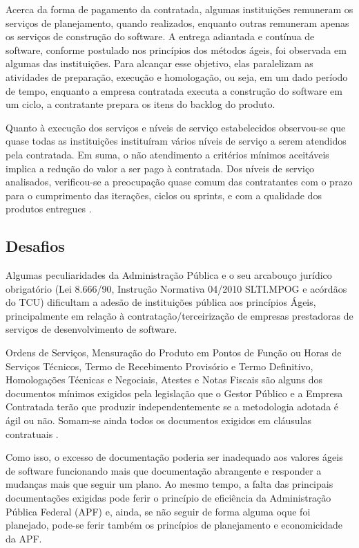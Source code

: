 Acerca da forma de pagamento da contratada, algumas instituições remuneram os serviços de planejamento, quando realizados, enquanto outras remuneram apenas os serviços de construção do software. A entrega adiantada e contínua de software, conforme postulado nos princípios dos métodos ágeis, foi observada em algumas das instituições. Para alcançar esse objetivo, elas paralelizam as atividades de preparação, execução e homologação, ou seja, em um dado período de tempo, enquanto a empresa contratada executa a construção do software em um ciclo, a contratante prepara os itens do backlog do produto. 

Quanto à execução dos serviços e níveis de serviço estabelecidos observou-se que quase todas as instituições instituíram vários níveis de serviço a serem atendidos pela contratada. Em suma, o não atendimento a critérios mínimos aceitáveis implica a redução do valor a ser pago à contratada. Dos níveis de serviço analisados, verificou-se a preocupação quase comum das contratantes com o prazo para o cumprimento das iterações, ciclos ou sprints, e com a qualidade dos produtos entregues  \cite{TCU:2013}.

\subsection[Desafios]{Desafios}

Algumas peculiaridades da Administração Pública e o seu arcabouço jurídico obrigatório (Lei 8.666/90, Instrução Normativa 04/2010 SLTI.MPOG e acórdãos do TCU) dificultam a adesão de instituições pública aos princípios Ágeis, principalmente em relação à contratação/terceirização de empresas prestadoras de serviços de desenvolvimento de software.

Ordens de Serviços, Mensuração do Produto em Pontos de Função ou Horas de Serviços Técnicos, Termo de Recebimento Provisório e Termo Definitivo, Homologações Técnicas e Negociais, Atestes e Notas Fiscais são alguns dos documentos mínimos exigidos pela legislação que o Gestor Público e a Empresa Contratada terão que produzir independentemente se a metodologia adotada é ágil ou não. Somam-se ainda todos os documentos exigidos em cláusulas contratuais   \cite{agilebrazil}. 

Como isso, o excesso de documentação poderia ser inadequado aos valores ágeis de software funcionando mais que documentação abrangente e responder a mudanças mais que seguir um plano. Ao mesmo tempo, a falta das principais documentações exigidas pode ferir o princípio de eficiência da Administração Pública Federal (APF) e, ainda, se não seguir de forma alguma oque foi  planejado, pode-se ferir também os princípios de planejamento e economicidade da APF. \cite{ruas}

